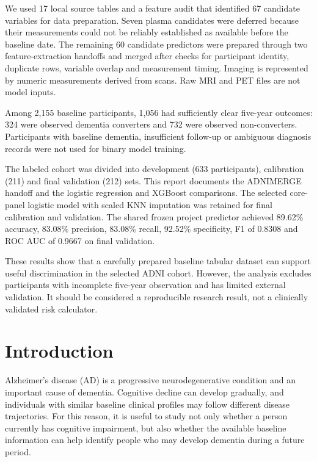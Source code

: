 \documentclass[11pt,a4paper]{article}
\begin{document}
We used 17 local source tables and a feature audit that identified 67 candidate variables for data preparation. Seven plasma candidates were deferred because their measurements could not be reliably established as available before the baseline date. The remaining 60 candidate predictors were prepared through two feature-extraction handoffs and merged after checks for participant identity, duplicate rows, variable overlap and measurement timing. Imaging is represented by numeric measurements derived from scans. Raw MRI and PET files are not model inputs.

Among 2,155 baseline participants, 1,056 had sufficiently clear five-year outcomes: 324 were observed dementia converters and 732 were observed non-converters. Participants with baseline dementia, insufficient follow-up or ambiguous diagnosis records were not used for binary model training.

The labeled cohort was divided into development (633 participants), calibration (211) and final validation (212) sets. This report documents the ADNIMERGE handoff and the logistic regression and XGBoost comparisons. The selected core-panel logistic model with scaled KNN imputation was retained for final calibration and validation. The shared frozen project predictor achieved 89.62\% accuracy, 83.08\% precision, 83.08\% recall, 92.52\% specificity, F1 of 0.8308 and ROC AUC of 0.9667 on final validation.

These results show that a carefully prepared baseline tabular dataset can support useful discrimination in the selected ADNI cohort. However, the analysis excludes participants with incomplete five-year observation and has limited external validation. It should be considered a reproducible research result, not a clinically validated risk calculator.

\clearpage\tableofcontents\clearpage
\section{Introduction}
Alzheimer's disease (AD) is a progressive neurodegenerative condition and an important cause of dementia. Cognitive decline can develop gradually, and individuals with similar baseline clinical profiles may follow different disease trajectories. For this reason, it is useful to study not only whether a person currently has cognitive impairment, but also whether the available baseline information can help identify people who may develop dementia during a future period.
\end{document}
